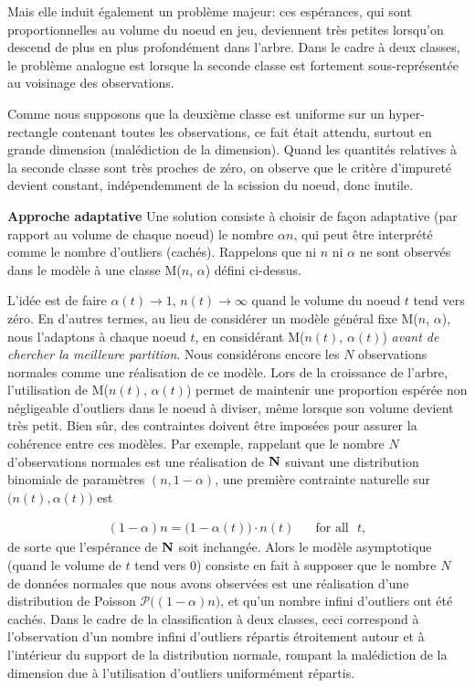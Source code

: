 Mais elle induit également un problème majeur: ces espérances, qui sont proportionnelles au volume du noeud en jeu, deviennent très petites lorsqu'on descend de plus en plus profondément dans l'arbre. Dans le cadre à deux classes, le problème analogue est lorsque la seconde classe est fortement sous-représentée au voisinage des observations.

Comme nous supposons que la deuxième classe est uniforme sur un hyper-rectangle contenant toutes les observations, ce fait était attendu, surtout en grande dimension (malédiction de la dimension). Quand les quantités relatives à la seconde classe sont très proches de zéro, on observe que le critère d'impureté devient constant, indépendemment de la scission du noeud, donc inutile.

\textbf{Approche adaptative}
%
Une solution consiste à choisir de façon adaptative (par rapport au volume de chaque noeud) le nombre $\alpha n $, qui peut être interprété comme le nombre d'outliers (cachés). Rappelons que ni $n$ ni $\alpha $ ne sont observés dans le modèle à une classe M($n$, $\alpha$) défini ci-dessus.

L'idée est de faire $\alpha(t) \to 1$, $n(t) \to \infty$ quand le volume du noeud $t$ tend vers zéro. 
En d'autres termes, au lieu de considérer un modèle général fixe M($n$, $\alpha$), nous l'adaptons à chaque noeud $t$, en considérant M($n(t)$, $\alpha(t)$) \emph{avant de chercher la meilleure partition}. Nous considérons encore les $N$ observations normales comme une réalisation de ce modèle. Lors de la croissance de l'arbre, l'utilisation de M($n(t)$, $\alpha(t)$) permet de maintenir une proportion espérée non négligeable d'outliers dans le noeud à diviser, même lorsque son volume devient très petit. Bien sûr, des contraintes doivent être imposées pour assurer la cohérence entre ces modèles. Par exemple, rappelant que le nombre $N$ d'observations normales est une réalisation de $\mathbf N $ suivant une distribution binomiale de paramètres $ (n, 1-\alpha) $, une première contrainte naturelle sur $\big(n(t), \alpha(t)\big)$  est

\begin{align}
\label{resume_fr:constraint1}
(1-\alpha)n = \big(1-\alpha(t)\big) \cdot n(t) \text{~~~~~for all~~} t,
\end{align}
de sorte que l'espérance de $\mathbf N$ soit inchangée.
Alors le modèle asymptotique (quand le volume de $t$ tend vers $0$) consiste en fait à supposer que le nombre $N$ de données normales que nous avons observées est une réalisation d'une distribution de Poisson $\mathcal{P}\big((1-\alpha)n\big)$,
et qu'un nombre infini d'outliers ont été cachés. Dans le cadre de la classification à deux classes, ceci correspond à l'observation d'un nombre infini d'outliers répartis étroitement autour et à l'intérieur du support de la distribution normale, rompant la malédiction de la dimension due à l'utilisation d'outliers uniformément répartis.

